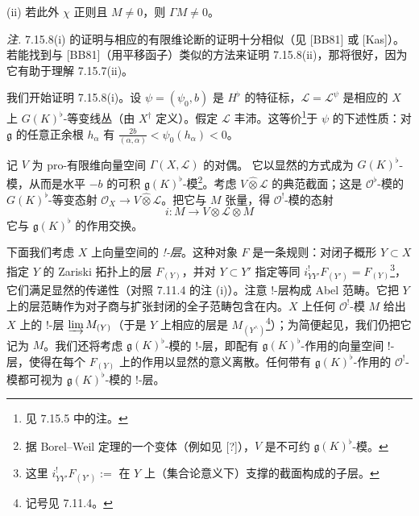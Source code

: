 (ii) 若此外 $\chi$ 正则且 $M\ne0$，则 $\Gamma M\ne0$。

\emph{注.} 7.15.8(i) 的证明与相应的有限维论断的证明十分相似（见 [BB81] 或 [Kas]）。若能找到与 [BB81]（用平移函子）类似的方法来证明 7.15.8(ii)，那将很好，因为它有助于理解 7.15.7(ii)。

 我们开始证明 7.15.8(i)。设 $\psi=(\psi_0,b)$ 是 $H^{\flat}$ 的特征标，$\mathcal{L}=\mathcal{L}^{\psi}$ 是相应的 $X$ 上 $G(K)^{\flat}$-等变线丛（由 $X^{\dagger}$ 定义）。假定 $\mathcal{L}$ 丰沛。这等价\footnote{见 7.15.5 中的注。}于 $\psi$ 的下述性质：对 $\mathfrak{g}$ 的任意正余根 $h_{\alpha}$ 有 $\frac{2b}{(\alpha,\alpha)}<\psi_0(h_{\alpha})<0$。

记 $V$ 为 pro-有限维向量空间 $\Gamma(X,\mathcal{L})$ 的对偶。%
它以显然的方式成为 $G(K)^{\flat}$-模，从而是水平 $-b$ 的可积 $\mathfrak{g}(K)^{\flat}$-模\footnote{据 Borel--Weil 定理的一个变体（例如见 [?]），$V$ 是不可约 $\mathfrak{g}(K)^{\flat}$-模。}。考虑 $V\widehat{\otimes}\mathcal{L}$ 的典范截面；这是 $\mathcal{O}^{\flat}$-模的 $G(K)^{\flat}$-等变态射 $\mathcal{O}_X\to V\widehat{\otimes}\mathcal{L}$。把它与 $M$ 张量，得 $\mathcal{O}^{!}$-模的态射
\begin{equation}\tag{388}
i:M\to V\otimes\mathcal{L}\otimes M
\end{equation}
它与 $\mathfrak{g}(K)^{\flat}$ 的作用交换。%

 下面我们考虑 $X$ 上向量空间的 \emph{!-层}。这种对象 $F$ 是一条规则：对闭子概形 $Y\subset X$ 指定 $Y$ 的 Zariski 拓扑上的层 $F_{(Y)}$，并对 $Y\subset Y'$ 指定等同 $i^{!}_{YY'}F_{(Y')}=F_{(Y)}$\footnote{这里 $i^{!}_{YY'}F_{(Y')}:=$ 在 $Y$ 上（集合论意义下）支撑的截面构成的子层。}，它们满足显然的传递性（对照 7.11.4 的注 (i)）。注意 !-层构成 Abel 范畴。它把 $Y$ 上的层范畴作为对子商与扩张封闭的全子范畴包含在内。$X$ 上任何 $\mathcal{O}^{!}$-模 $M$ 给出 $X$ 上的 !-层 $\varinjlim M_{(Y)}$（于是 $Y$ 上相应的层是 $M_{(Y^{\wedge})}$\footnote{记号见 7.11.4。}）；为简便起见，我们仍把它记为 $M$。我们还将考虑 $\mathfrak{g}(K)^{\flat}$-模的 !-层，即配有 $\mathfrak{g}(K)^{\flat}$-作用的向量空间 !-层，使得在每个 $F_{(Y)}$ 上的作用以显然的意义离散。任何带有 $\mathfrak{g}(K)^{\flat}$-作用的 $\mathcal{O}^{!}$-模都可视为 $\mathfrak{g}(K)^{\flat}$-模的 !-层。

